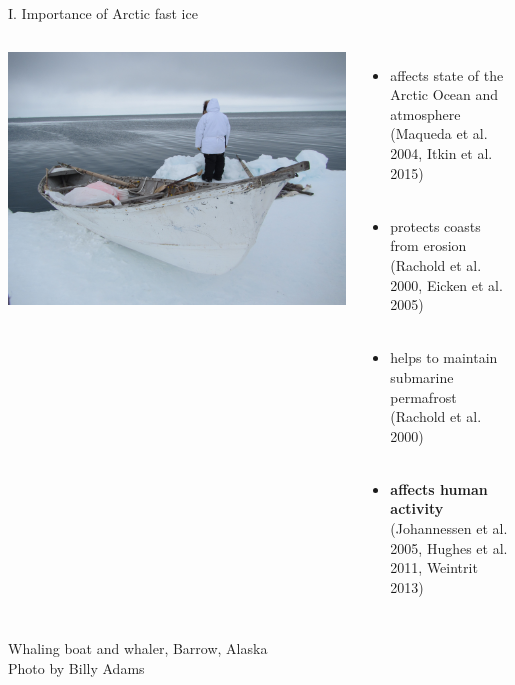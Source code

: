 \documentclass[8pt]{beamer}
\newcommand\Fontvi{\fontsize{6}{7.2}\selectfont}
\begin{document}
\setwatermark{\fontsize{125pt}{125pt}\selectfont{}}
\begin{frame}[fragile]{I. Importance of Arctic fast ice}
	\begin{columns}
		\includegraphics[width=1\textwidth]{./img/Whaling-Boat-and-whaler-Barrow-1.jpg}\\
		\begin{itemize}
			\item affects state of the Arctic Ocean and atmosphere\\(Maqueda et al. 2004, Itkin et al. 2015)\\~\\ 
			\item protects coasts from erosion\\(Rachold et al. 2000, Eicken et al. 2005)\\~\\ 
			\item helps to maintain submarine permafrost\\ (Rachold et al. 2000)\\~\\
			\item \textbf{affects human activity}\\(Johannessen et al. 2005, Hughes et al. 2011, Weintrit 2013)
		\end{itemize}
	\end{columns}
	\Fontvi
	Whaling boat and whaler, Barrow, Alaska\\
	Photo by Billy Adams
\end{frame}
\end{document}
